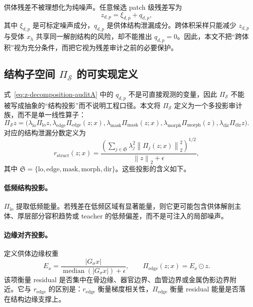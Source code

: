 \documentclass[11pt,a4paper,UTF8,fontset=fandol]{ctexart}
\theoremstyle{definition}
\newcommand{\norm}[1]{\left\lVert#1\right\rVert}
\begin{document}
供体残差不被理想化为纯噪声。任意候选 patch 级残差写为
\begin{equation}
\label{eq:z-decomposition-auditA}
    z_{d,p}=\xi_{d,p}+q_{d,p},
\end{equation}
其中 $\xi_{d,p}$ 是可标定噪声成分，$q_{d,p}$ 是供体结构泄漏成分。跨体积采样只能减少 $z_{d,p}$ 与受体 $x_h$ 共享同一解剖结构的风险，却不能推出 $q_{d,p}=0$。因此，本文不把“跨体积”视为充分条件，而把它视为残差审计之前的必要保护。


\subsection{结构子空间 \texorpdfstring{$\Pi_{\mathcal S}$}{PiS} 的可实现定义}

式~\eqref{eq:z-decomposition-auditA} 中的 $q_{d,p}$ 不是可直接观测的变量，因此 $\Pi_{\mathcal S}$ 不能被写成抽象的“结构投影”而不说明工程口径。本文将 $\Pi_{\mathcal S}$ 定义为一个多投影审计族，而不是单一线性算子：
\begin{equation}
\label{eq:pis-family-auditB}
    \Pi_{\mathcal S}z
    =\Big(
    \lambda_{\mathrm{lo}}\Pi_{\mathrm{lo}}z,
    \lambda_{\mathrm{edge}}\Pi_{\mathrm{edge}}(z;x),
    \lambda_{\mathrm{mask}}\Pi_{\mathrm{mask}}(z;x),
    \lambda_{\mathrm{morph}}\Pi_{\mathrm{morph}}(z),
    \lambda_{\mathrm{dir}}\Pi_{\mathrm{dir}}z
    \Big).
\end{equation}
对应的结构泄漏分数定义为
\begin{equation}
\label{eq:struct-score-auditB}
    r_{\mathrm{struct}}(z;x)
    =\frac{
    \left(\sum_{j\in\mathfrak S}\lambda_j^2\norm{\Pi_j(z;x)}_2^2\right)^{1/2}}
    {\norm{z}_2+\epsilon},
\end{equation}
其中 $\mathfrak S=\{\mathrm{lo},\mathrm{edge},\mathrm{mask},\mathrm{morph},\mathrm{dir}\}$。这些投影的含义如下。

\paragraph{低频结构投影。}
$\Pi_{\mathrm{lo}}$ 提取低频能量。若残差在低频区域有显著能量，则它更可能包含供体解剖主体、厚层部分容积趋势或 teacher 的低频偏差，而不是可注入的局部噪声。

\paragraph{边缘对齐投影。}
定义供体边缘权重
\begin{equation}
    E_x=\frac{|G_\sigma x|}{\operatorname{median}(|G_\sigma x|)+\epsilon},
    \qquad
    \Pi_{\mathrm{edge}}(z;x)=E_x\odot z.
\end{equation}
该项衡量 residual 是否集中在骨边缘、器官边界、血管边界或金属伪影边界附近。它与 $r_{\mathrm{edge}}$ 的区别是：$r_{\mathrm{edge}}$ 衡量梯度相关性，$\Pi_{\mathrm{edge}}$ 衡量 residual 能量是否落在结构边缘支撑上。
\end{document}
